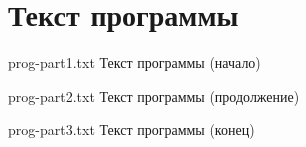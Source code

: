 \chapter{Текст программы}

{prog-part1.txt} %
{Текст программы (начало)} %

\clearpage

{prog-part2.txt} %
{Текст программы (продолжение)} %

{prog-part3.txt} %
{Текст программы (конец)} %